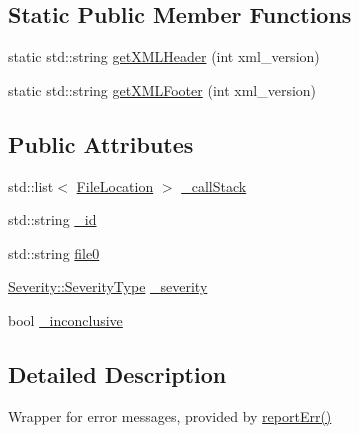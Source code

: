 \subsection*{Static Public Member Functions}
\begin{DoxyCompactItemize}
\item 
static std\-::string \hyperlink{class_error_logger_1_1_error_message_a1a189796db0cf930d9dac592c671e962}{get\-X\-M\-L\-Header} (int xml\-\_\-version)
\item 
static std\-::string \hyperlink{class_error_logger_1_1_error_message_a1a27b7076758895909b665c180cbf4cb}{get\-X\-M\-L\-Footer} (int xml\-\_\-version)
\end{DoxyCompactItemize}
\subsection*{Public Attributes}
\begin{DoxyCompactItemize}
\item 
std\-::list$<$ \hyperlink{class_error_logger_1_1_error_message_1_1_file_location}{File\-Location} $>$ \hyperlink{class_error_logger_1_1_error_message_a727cfc17112cf06d0084073a52c87f2a}{\-\_\-call\-Stack}
\item 
std\-::string \hyperlink{class_error_logger_1_1_error_message_a197e43bcf760ff271d226649cd09bccb}{\-\_\-id}
\item 
std\-::string \hyperlink{class_error_logger_1_1_error_message_a7efa13ab9225aee1b195f878268e0ea6}{file0}
\item 
\hyperlink{class_severity_ac185938ae084355bbf1790cf1a70caa6}{Severity\-::\-Severity\-Type} \hyperlink{class_error_logger_1_1_error_message_ad78317198d39ccb893b3a01a36ecce36}{\-\_\-severity}
\item 
bool \hyperlink{class_error_logger_1_1_error_message_a066e50962b37330bc0394bf7cf9ebd45}{\-\_\-inconclusive}
\end{DoxyCompactItemize}


\subsection{Detailed Description}
Wrapper for error messages, provided by \hyperlink{class_error_logger_aea56e01f24c0d8ecaa5498ae4eba1739}{report\-Err()} 

